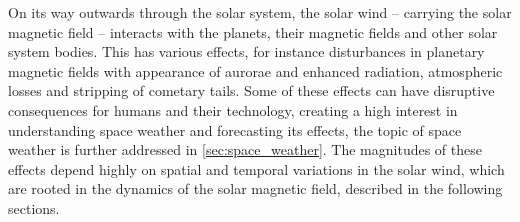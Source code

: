 \begin{figure}[htb]
\end{figure}

On its way outwards through the solar system, the solar wind -- carrying the solar magnetic field -- interacts with the planets, their magnetic fields and other solar system bodies. This has various effects, for instance disturbances in planetary magnetic fields with appearance of aurorae and enhanced radiation, atmospheric losses and stripping of cometary tails. Some of these effects can have disruptive consequences for humans and their technology, creating a high interest in understanding space weather and forecasting its effects, the topic of space weather is further addressed in \autoref{sec:space_weather}. The magnitudes of these effects depend highly on spatial and temporal variations in the solar wind, which are rooted in the dynamics of the solar magnetic field, described in the following sections.

